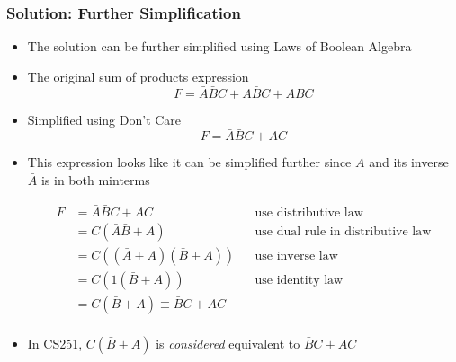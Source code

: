 \ifnum{}
\begin{frame}\frametitle{Solution: Further Simplification}
\begin{itemize}
    \item The solution can be further simplified using Laws of Boolean Algebra
\item The original sum of products expression
$$F=\bar{A} \bar{B} C + A\bar{B} C + ABC$$
\item Simplified using Don't Care 
$$F = \bar{A} \bar{B} C + AC$$
\item This expression looks like it can be simplified further since $A$ and its inverse $\bar{A}$ is in both minterms


{\footnotesize
\begin{align*}
F&=\bar{A} \bar{B} C + AC & &     \text{use distributive law}\\
&=C (\bar{A} \bar{B} + A)        & &     \text{use dual rule in distributive law}\\
&=C ((\bar{A} + A)(\bar{B} + A)) & &\text{use inverse law}\\
&=C (1 (\bar{B} + A)) & &\text{use identity law} \\
&=C (\bar{B} + A) \equiv \bar{B} C + AC\\
\end{align*}}
\item In CS251, $C (\bar{B} + A)$ is \textit{considered} equivalent to $\bar{B} C + AC$
\end{itemize}
\end{frame}
\fi





